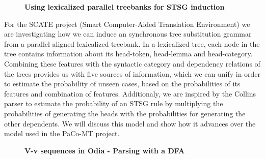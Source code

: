 \documentclass[10pt, a4paper, twopage, headinclude, footinclude, BCOR5mm]{book}
\begin{document}
\newpage

\begin{figure}[t!]
\centering
\large\textbf{Using lexicalized parallel treebanks for STSG induction}
\vspace*{0.5cm}
\end{figure}


\begin{table}[t!]
\end{table} 
\noindent
For the SCATE project (Smart Computer-Aided Translation Environment) we are investigating how we can induce an synchronous tree substitution grammar from a parallel aligned lexicalized treebank. In a lexicalized tree, each node in the tree contains information about its head-token, head-lemma and head-category. Combining these features with the syntactic category and dependency relations of the trees provides us with five sources of information, which we can unify in order to estimate the probability of unseen cases, based on the probabilities of its features and combination of features. Additionaly, we are inspired by the Collins parser to estimate the probability of an STSG rule by multiplying the probabilities of generating the heads with the probabilities for generating the other dependents. We will discuss this model and show how it advances over the model used in the PaCo-MT project.   

\newpage

\begin{figure}[t!]
\centering
\large\textbf{V-v sequences in Odia - Parsing with a DFA}
\vspace*{0.5cm}
\end{figure}
\end{document}
